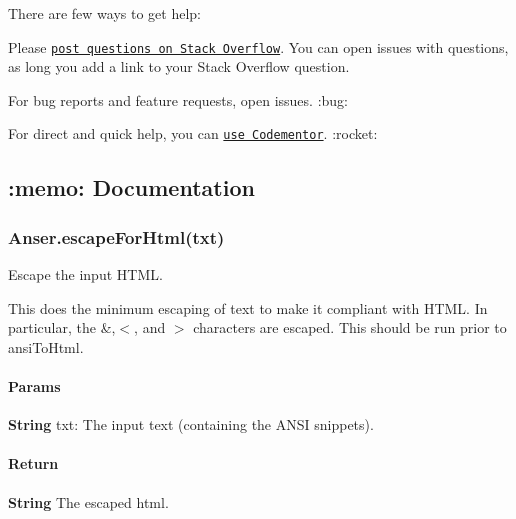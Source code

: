 There are few ways to get help\+:


\begin{DoxyEnumerate}
\item Please \href{https://stackoverflow.com/questions/ask}{\tt post questions on Stack Overflow}. You can open issues with questions, as long you add a link to your Stack Overflow question.
\item For bug reports and feature requests, open issues. \+:bug\+:
\item For direct and quick help, you can \href{https://www.codementor.io/johnnyb}{\tt use Codementor}. \+:rocket\+:
\end{DoxyEnumerate}

\subsection*{\+:memo\+: Documentation}

\subsubsection*{{\ttfamily Anser.\+escape\+For\+Html(txt)}}

Escape the input H\+T\+ML.

This does the minimum escaping of text to make it compliant with H\+T\+ML. In particular, the \textquotesingle{}\&\textquotesingle{},\textquotesingle{}$<$\textquotesingle{}, and \textquotesingle{}$>$\textquotesingle{} characters are escaped. This should be run prior to {\ttfamily ansi\+To\+Html}.

\paragraph*{Params}


\begin{DoxyItemize}
\item {\bfseries String} {\ttfamily txt}\+: The input text (containing the A\+N\+SI snippets).
\end{DoxyItemize}

\paragraph*{Return}


\begin{DoxyItemize}
\item {\bfseries String} The escaped html.
\end{DoxyItemize}

